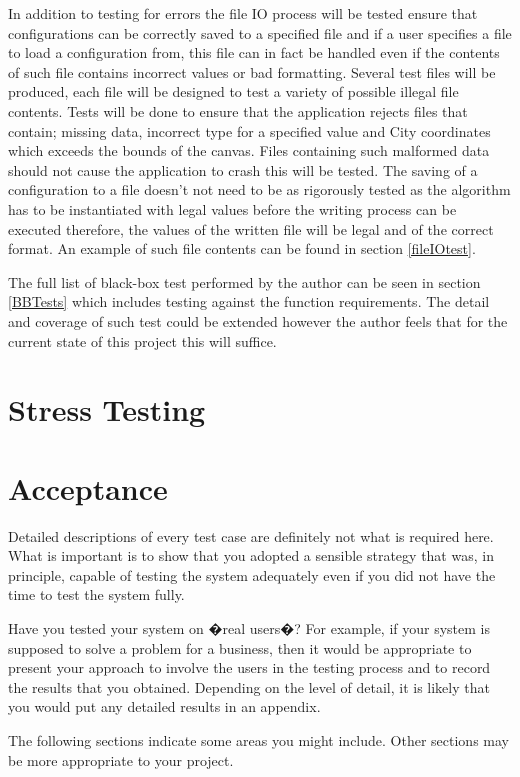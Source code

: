In addition to testing for errors the file IO process will be tested ensure that configurations can be correctly saved to a specified file and if a user specifies a file to load a configuration from, this file can in fact be handled even if the contents of such file contains incorrect values or bad formatting. Several test files will be produced, each file will be designed to test a variety of possible illegal file contents. Tests will be done to ensure that the application rejects files that contain; missing data, incorrect type for a specified value and City coordinates which exceeds the bounds of the canvas. Files containing such malformed data should not cause the application to crash this will be tested. The saving of a configuration to a file doesn’t not need to be as rigorously tested as the algorithm has to be instantiated with legal values before the writing process can be executed therefore, the values of the written file will be legal and of the correct format. An example of such file contents can be found in section \ref{fileIOtest}.

The full list of black-box test performed by the author can be seen in section \ref{BBTests} which includes testing against the function requirements. The detail and coverage of such test could be extended however the author feels that for the current state of this project this will suffice.

\section{Stress Testing}

\section{Acceptance}

Detailed descriptions of every test case are definitely not what is required here. What is important is to show that you adopted a sensible strategy that was, in principle, capable of testing the system adequately even if you did not have the time to test the system fully.

Have you tested your system on �real users�? For example, if your system is supposed to solve a problem for a business, then it would be appropriate to present your approach to involve the users in the testing process and to record the results that you obtained. Depending on the level of detail, it is likely that you would put any detailed results in an appendix.

The following sections indicate some areas you might include. Other sections may be more appropriate to your project. 